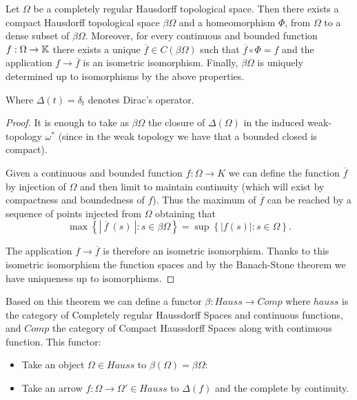 \begin{example}
\begin{itemize}
    \begin{theorem} Let $\Omega$ be a completely regular Hausdorff topological space. Then there exists a compact Hausdorff topological space $\beta \Omega$ and a homeomorphism $\Phi$, from $\Omega$ to a dense subset of $\beta\Omega$. Moreover, for every continuous and bounded function $f: \Omega \to \mathbb{K}$ there exists a unique $\overline{f} \in C(\beta \Omega)$ such that $\overline{f}\circ \Phi = f$ and the application $f \to \overline{f}$ is an isometric isomorphism. Finally, $\beta \Omega$ is uniquely determined up to isomorphisms by the above properties.
    \end{theorem}
    \begin{remark}
      Where $\Delta(t)=\delta_t$ denotes Dirac's operator.
    \end{remark}
    \begin{proof}
  It is enough to take as $\beta \Omega$ the closure of $\Delta(\Omega)$ in the induced weak-topology $\omega^*$ (since in the weak topology we have that a bounded closed is compact).  
                                                                                                                                                                         
  Given a continuous and bounded function $f:\Omega \to K$ we can define the function $\overline{f}$ by injection of $\Omega$ and then limit to maintain continuity (which will exist by compactness and boundedness of $f$). Thus the maximum of $\overline{f}$ can be reached by a sequence of points injected from  $\Omega$ obtaining that   
  $${\displaystyle\max\left\{|\ \overline{f}\ (s)\ | : s \in \beta\Omega\right\} = \sup\left\{| f(s) |: s \in \Omega\right\}}.$$

The application $f \to \overline{f}$ is therefore an isometric isomorphism. Thanks to this isometric isomorphism the function spaces and by the Banach-Stone theorem\cite[Theorem 3]{banach1932theorie} we have uniqueness up to isomorphisms.     
      \end{proof}

      Based on this theorem we can define a functor  $\beta:Hauss \to Comp$ where $hauss$ is the category of Completely regular Haussdorff  Spaces and continuous functions, and $Comp$ the category of Compact Haussdorff Spaces along with continuous function. This functor:
      \begin{itemize}
      \item Take an object $\Omega \in Hauss$ to $\beta(\Omega) = \beta\Omega$:
      \item Take an arrow $f:\Omega \to \Omega'\in Hauss$ to $\Delta(f)$ and the complete by continuity.
      \end{itemize}
      

\end{itemize}
\end{example}
